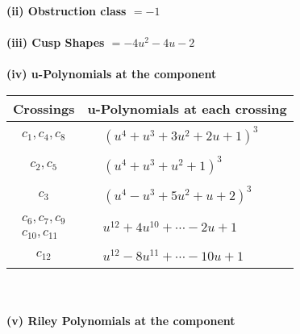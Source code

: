\documentclass[1p]{elsarticle_modified}
\theoremstyle{definition}
\begin{document}
\flushleft \textbf{(ii) Obstruction class $= -1$}\\~\\
\flushleft \textbf{(iii) Cusp Shapes $= -4 u^2-4 u-2$}\\~\\
\newpage\renewcommand{\arraystretch}{1}
\flushleft \textbf{(iv) u-Polynomials at the component}\newline \\
\begin{tabular}{m{50pt}|m{274pt}}
Crossings & \hspace{64pt}u-Polynomials at each crossing \\
\hline $$\begin{aligned}c_{1},c_{4},c_{8}\end{aligned}$$&$\begin{aligned}
&(u^4+u^3+3 u^2+2 u+1)^3
\end{aligned}$\\
\hline $$\begin{aligned}c_{2},c_{5}\end{aligned}$$&$\begin{aligned}
&(u^4+u^3+u^2+1)^3
\end{aligned}$\\
\hline $$\begin{aligned}c_{3}\end{aligned}$$&$\begin{aligned}
&(u^4- u^3+5 u^2+u+2)^3
\end{aligned}$\\
\hline $$\begin{aligned}c_{6},c_{7},c_{9}\\c_{10},c_{11}\end{aligned}$$&$\begin{aligned}
&u^{12}+4 u^{10}+\cdots-2 u+1
\end{aligned}$\\
\hline $$\begin{aligned}c_{12}\end{aligned}$$&$\begin{aligned}
&u^{12}-8 u^{11}+\cdots-10 u+1
\end{aligned}$\\
\hline
\end{tabular}\\~\\
\newpage\renewcommand{\arraystretch}{1}
\flushleft \textbf{(v) Riley Polynomials at the component}\newline \\
\end{document}
